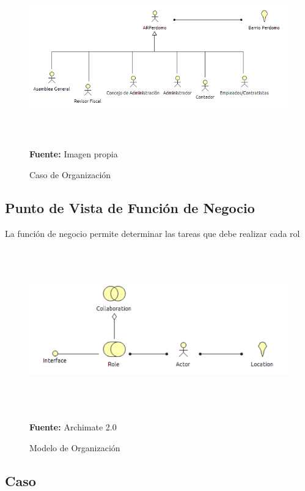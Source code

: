 \begin{figure}[th!]
	\centering
	\includegraphics[width=12cm,height=7cm]{arquitectura/negocio/imgs/organizacion}
	\caption{Caso de Organización}{\scriptsize \textbf{Fuente:} Imagen propia}
\end{figure}
\newpage

\subsection{Punto de Vista de Función de Negocio}

La función de negocio permite determinar las tareas que debe realizar cada rol


\begin{figure}[th!]
	\centering
	\includegraphics[width=12cm,height=7cm]{arquitectura/negocio/imgs/m_organizacion}
	\caption{Modelo de Organización}{\scriptsize \textbf{Fuente:} Archimate 2.0}
\end{figure}

\newpage
\subsection{Caso}

